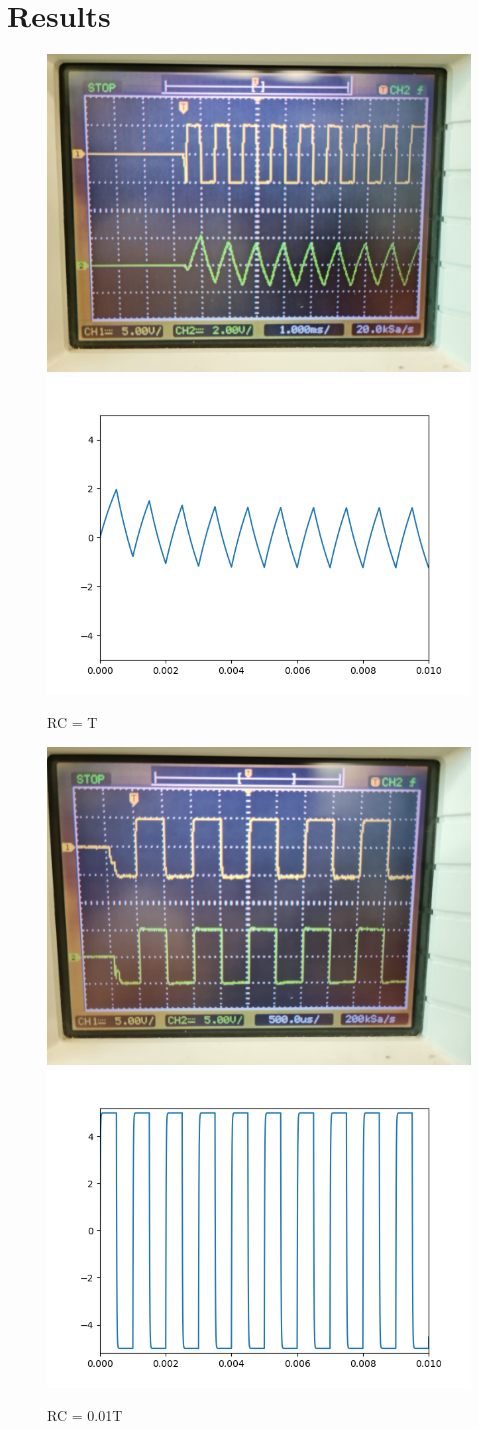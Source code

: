 \documentclass[a4paper,12pt]{article}
\begin{document}
\section{Results}
\begin{figure}[!htb]
  {\includegraphics[width=0.5\columnwidth]{figs/RC=T_exp.jpg}}
  \hspace{\fill}
  {\includegraphics[width=0.5\columnwidth]{figs/RC=T_sim.png}}
  \caption{RC = T}
\end{figure}
 \begin{figure}[!htb]
  {\includegraphics[width=0.5\columnwidth]{figs/RC=0.01T_exp.jpg}}
  \hspace{\fill}
  {\includegraphics[width=0.5\columnwidth]{figs/RC=0.01T_sim.png}}
  \caption{RC = 0.01T}
\end{figure}
\end{document}
